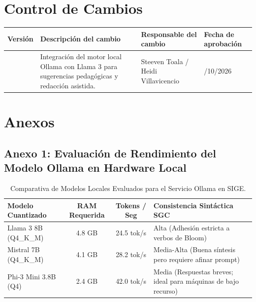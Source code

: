 \documentclass[12pt,a4paper]{article}
\begin{document}
\vspace{0.4cm}

\section{Control de Cambios}

\noindent
\renewcommand{\arraystretch}{1.2}
\begin{tabularx}{\textwidth}{|>{\hsize=0.45\hsize\centering\arraybackslash}X|>{\hsize=1.55\hsize\raggedright\arraybackslash}X|>{\hsize=1.2\hsize\raggedright\arraybackslash}X|>{\hsize=0.8\hsize\centering\arraybackslash}X|}
    \hline
    \rowcolor{tableheader}
    \textbf{Versión} & \textbf{Descripción del cambio} & \textbf{Responsable del cambio} & \textbf{Fecha de aprobación} \\
    \hline
    1.0 & Integración del motor local Ollama con Llama 3 para sugerencias pedagógicas y redacción asistida. & Steeven Toala / Heidi Villavicencio & 07/10/2026 \\
    \hline
\end{tabularx}

\vspace{0.4cm}

\section{Anexos}

\subsection*{Anexo 1: Evaluación de Rendimiento del Modelo Ollama en Hardware Local}
\begin{table}[H]
\centering
\small
\begin{tabularx}{\textwidth}{|l|c|c|X|}
\hline
\rowcolor{tableheader}
\textbf{Modelo Cuantizado} & \textbf{RAM Requerida} & \textbf{Tokens / Seg} & \textbf{Consistencia Sintáctica SGC} \\ \hline
Llama 3 8B (Q4\_K\_M) & 4.8 GB & 24.5 tok/s & Alta (Adhesión estricta a verbos de Bloom) \\ \hline
Mistral 7B (Q4\_K\_M) & 4.1 GB & 28.2 tok/s & Media-Alta (Buena síntesis pero requiere afinar prompt) \\ \hline
Phi-3 Mini 3.8B (Q4) & 2.4 GB & 42.0 tok/s & Media (Respuestas breves; ideal para máquinas de bajo recurso) \\ \hline
\end{tabularx}
\caption{Comparativa de Modelos Locales Evaluados para el Servicio Ollama en SIGE.}
\label{tab:evaluacion_llm}
\end{table}
\end{document}
